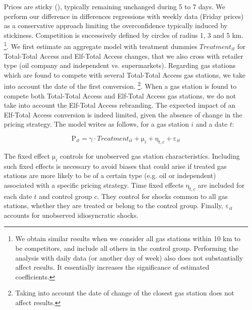 \documentclass[english]{article}
\begin{document}
Prices are sticky (\cite{GAU15}), typically remaining unchanged during 5 to 7 days. We perform our difference in differences regressions with weekly data (Friday prices) as a conservative approach
limiting the overconfidence typically induced by stickiness. Competition is successively defined by circles of radius 1, 3 and 5 km.%
\footnote{We obtain similar results when we consider all gas stations within 10 km to be competitors, and include all others in the control group. Performing the analysis with daily data (or another day of week)
also does not substantially affect results. It essentially increases the significance of estimated coefficients.%
}. We first estimate an aggregate model with treatment dummies $Treatment_{it}$ for Total-Total Access and Elf-Total Access changes, that we also cross with retailer type (oil company and independent vs. supermarkets). Regarding gas stations which are found to compete with several Total-Total Access gas stations, we take into account the date of the first conversion.%
\footnote{Taking into account the date of change of the closest gas station does not affect results.%
}. When a gas station is found to compete both Total-Total Access and Elf-Total Access gas stations, we do not take into account the Elf-Total Access rebranding. The expected impact of an Elf-Total Access conversion is indeed limited, given the absence of change in the pricing strategy. The model writes as follows, for a gas station $i$ and a date $t$:

\begin{equation}
\mathrm{P}_{it}=\mathrm{\gamma}\cdot Treatment_{it}+\mathrm{\mu}_{i}+\mathrm{\eta}_{t,c}+\mathrm{\varepsilon}_{it}\label{eq:1}
\end{equation}

\medskip{}

The fixed effect $\mathrm{\mu}_{i}$ controls for unobserved gas station characteristics. Including such fixed effects is necessary to avoid biases that could arise if treated gas stations are more likely to be of a certain type (e.g. oil or independent) associated with a specific pricing strategy. Time fixed effects $\mathrm{\eta}_{t,c}$ are included for each date $t$ and control group $c$. They control for shocks common to all gas stations, whether they are treated or belong to the control group. Finally, $\mathrm{\varepsilon}_{it}$ accounts for unobserved idiosyncratic shocks.
\medskip{}
\end{document}
